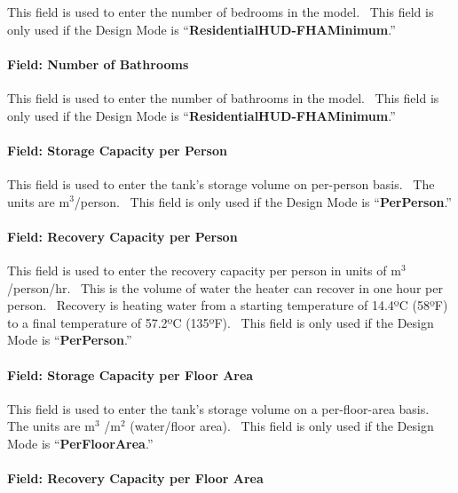 This field is used to enter the number of bedrooms in the model.~ This field is only used if the Design Mode is ``\textbf{ResidentialHUD-FHAMinimum}.''

\paragraph{Field: Number of Bathrooms}\label{field-number-of-bathrooms}

This field is used to enter the number of bathrooms in the model.~ This field is only used if the Design Mode is ``\textbf{ResidentialHUD-FHAMinimum}.''

\paragraph{Field: Storage Capacity per Person}\label{field-storage-capacity-per-person}

This field is used to enter the tank's storage volume on per-person basis.~ The units are m\(^{3}\)/person.~ This field is only used if the Design Mode is ``\textbf{PerPerson}.''

\paragraph{Field: Recovery Capacity per Person}\label{field-recovery-capacity-per-person}

This field is used to enter the recovery capacity per person in units of m\(^{3}\)/person/hr.~ This is the volume of water the heater can recover in one hour per person.~ Recovery is heating water from a starting temperature of 14.4ºC (58ºF) to a final temperature of 57.2ºC (135ºF).~ This field is only used if the Design Mode is ``\textbf{PerPerson}.''

\paragraph{Field: Storage Capacity per Floor Area}\label{field-storage-capacity-per-floor-area}

This field is used to enter the tank's storage volume on a per-floor-area basis.~ The units are m\(^{3}\) /m\(^{2}\) (water/floor area).~ This field is only used if the Design Mode is ``\textbf{PerFloorArea}.''

\paragraph{Field: Recovery Capacity per Floor Area}\label{field-recovery-capacity-per-floor-area}

